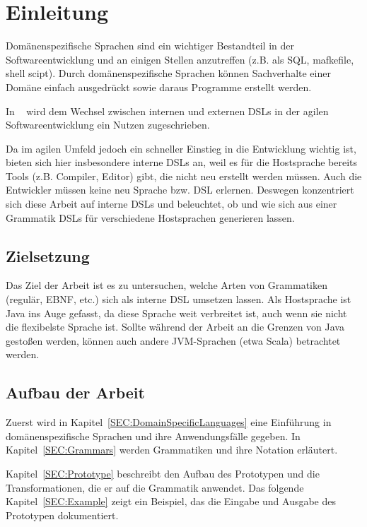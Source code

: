 \documentclass[../InterneDSLs.tex]{subfiles}
\begin{document}
\chapter{Einleitung}
Domänenspezifische Sprachen sind ein wichtiger Bestandteil in der Softwareentwicklung und an einigen Stellen anzutreffen (z.B. als SQL, mafkefile, shell scipt). Durch domänenspezifische Sprachen können Sachverhalte einer Domäne einfach ausgedrückt sowie daraus Programme erstellt werden. 

In ~\cite{butting2018deriving} wird dem Wechsel zwischen internen und externen DSLs in der agilen Softwareentwicklung ein Nutzen zugeschrieben.

Da im agilen Umfeld jedoch ein schneller Einstieg in die Entwicklung wichtig ist, bieten sich hier insbesondere interne \acsp{DSL} an, weil es für die Hostsprache bereits Tools (z.B. Compiler, Editor) gibt, die nicht neu erstellt werden müssen. Auch die Entwickler müssen keine neu Sprache bzw. DSL erlernen. Deswegen konzentriert sich diese Arbeit auf interne DSLs und beleuchtet, ob und wie sich aus einer Grammatik DSLs für verschiedene Hostsprachen generieren lassen.


\section{Zielsetzung}
Das Ziel der Arbeit ist es zu untersuchen, welche Arten von Grammatiken (regulär, \ac{EBNF}, etc.) sich als interne DSL umsetzen lassen. Als Hostsprache ist Java ins Auge gefasst, da diese Sprache weit verbreitet ist, auch wenn sie nicht die flexibelste Sprache ist. Sollte während der Arbeit an die Grenzen von Java gestoßen werden, können auch andere \ac{JVM}-Sprachen (etwa Scala) betrachtet werden.


\section{Aufbau der Arbeit}
Zuerst wird in Kapitel~\ref{SEC:DomainSpecificLanguages} eine Einführung in domänenspezifische Sprachen und ihre Anwendungsfälle gegeben. In Kapitel~\ref{SEC:Grammars} werden Grammatiken und ihre Notation erläutert.

Kapitel~\ref{SEC:Prototype} beschreibt den Aufbau des Prototypen und die Transformationen, die er auf die Grammatik anwendet. Das folgende Kapitel~\ref{SEC:Example} zeigt ein Beispiel, das die Eingabe und Ausgabe des Prototypen dokumentiert.
\end{document}
